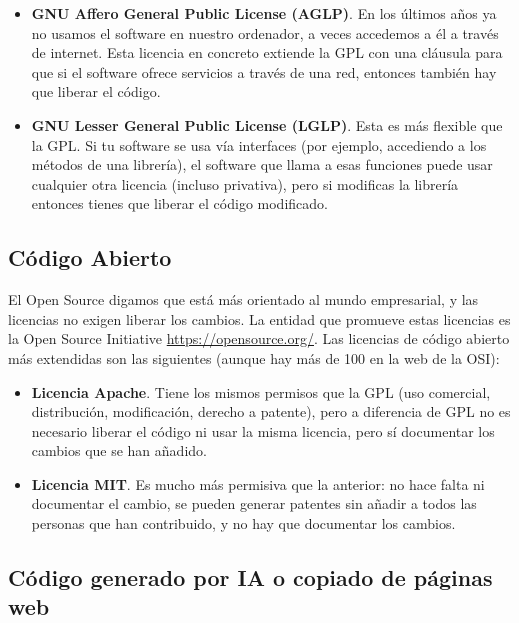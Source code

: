 \begin{naranja}
\begin{itemize}
\item \textbf{GNU Affero General Public License (AGLP)}. En los últimos años ya no usamos el software en nuestro ordenador, a veces accedemos a él a través de internet. Esta licencia en concreto extiende la GPL con una cláusula para que si el software ofrece servicios a través de una red, entonces también hay que liberar el código.

\item \textbf{GNU Lesser General Public License (LGLP)}. Esta es más flexible que la GPL. Si tu software se usa vía interfaces (por ejemplo, accediendo a los métodos de una librería), el software que llama a esas funciones puede usar cualquier otra licencia (incluso privativa), pero si modificas la librería entonces tienes que liberar el código modificado.

\end{itemize}

\subsection{Código Abierto}
El Open Source digamos que está más orientado al mundo empresarial, y las licencias no exigen liberar los cambios. La entidad que promueve estas licencias es la Open Source Initiative \url{https://opensource.org/}. Las licencias de código abierto más extendidas son las siguientes (aunque hay más de 100 en la web de la OSI):

\begin{itemize}
   
\item \textbf{Licencia Apache}. Tiene los mismos permisos que la GPL (uso comercial, distribución, modificación, derecho a patente), pero a diferencia de GPL no es necesario liberar el código ni usar la misma licencia, pero sí documentar los cambios que se han añadido.

\item \textbf{Licencia MIT}. Es mucho más permisiva que la anterior: no hace falta ni documentar el cambio, se pueden generar patentes sin añadir a todos las personas que han contribuido, y no hay que documentar los cambios.

\end{itemize}

\end{naranja}
\subsection{Código generado por IA o copiado de páginas web}

